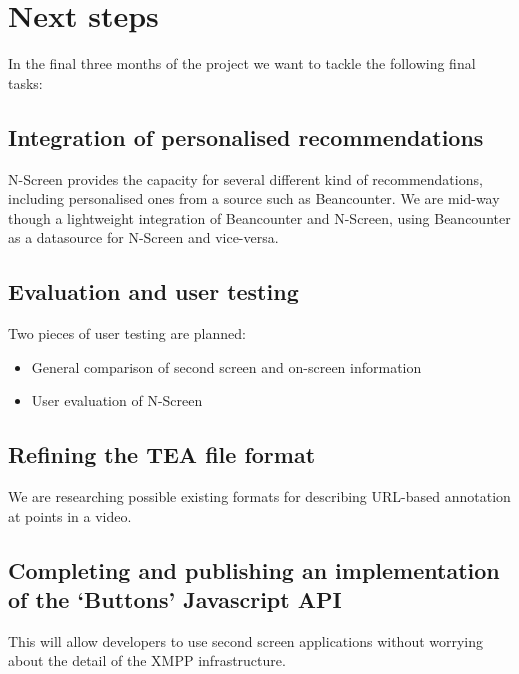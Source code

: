 \documentclass{notube}
\begin{document}
\section{Next steps}

In the final three months of the project we want to tackle the following final tasks:

\subsection{Integration of personalised recommendations}

N-Screen provides the capacity for several different kind of recommendations, including personalised ones from a source such as Beancounter. We are mid-way though a lightweight integration of Beancounter and N-Screen, using Beancounter as a datasource for N-Screen and vice-versa.

\subsection{Evaluation and user testing}

Two pieces of user testing are planned:

\begin{itemize}
\item{General comparison of second screen and on-screen information}
\item{User evaluation of N-Screen}
\end{itemize}

\subsection{Refining the TEA file format}

We are researching possible existing formats for describing URL-based annotation at points in a video.

\subsection{Completing and publishing an implementation of the `Buttons' Javascript API}

This will allow developers to use second screen applications without worrying about the detail of the XMPP infrastructure.
\end{document}
